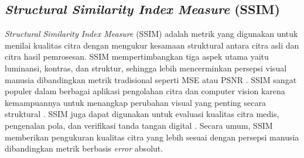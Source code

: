 \subsection{\textit{Structural Similarity Index Measure} (SSIM)}

\textit{Structural Similarity Index Measure} (SSIM) adalah metrik yang digunakan untuk menilai kualitas citra dengan mengukur kesamaan struktural antara citra asli dan citra hasil pemrosesan. SSIM mempertimbangkan tiga aspek utama yaitu luminansi, kontras, dan struktur, sehingga lebih mencerminkan persepsi visual manusia dibandingkan metrik tradisional seperti MSE atau PSNR \citep{Sara2019, Peng2020}. SSIM sangat populer dalam berbagai aplikasi pengolahan citra dan computer vision karena kemampuannya untuk menangkap perubahan visual yang penting secara struktural \citep{Lin2022}. SSIM juga dapat digunakan untuk evaluasi kualitas citra medis, pengenalan pola, dan verifikasi tanda tangan digital \citep{Peng2020, Yadav2025}. Secara umum, SSIM memberikan pengukuran kualitas citra yang lebih sesuai dengan persepsi manusia dibandingkan metrik berbasis \textit{error} absolut.  
%


%
%
%
%
